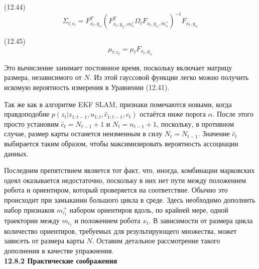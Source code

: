 \documentclass[10pt,a4paper]{article}
\begin{document}
(12.44)
$$\varSigma_{t:c_t}=F_{x_t,y_{c_t}}^T(F_{x_t,y_{c_t},m_{c_t}^+}^T\varOmega_tF_{x_t,y_{c_t},m_{c_t}^+})^{-1}F_{x_t,y_{c_t}}$$
	
(12.45)
$$\mu_{t:c_t}=\mu_tF_{x_t,y_{c_t}}$$

Это вычисление занимает постоянное время, поскольку включает матрицу размера, независимого от $N$. Из этой гауссовой функции легко можно получить искомую вероятность измерения в Уравнении (12.41).

Так же как в алгоритме EKF SLAM, признаки помечаются новыми, когда правдоподобие  $p(z_t|z_{1:t-1}, u_{1:t}, \hat{c}_{1:t-1}, c_t)$  остаётся ниже порога  $\alpha$. После этого просто установим $\hat{c}_t=N_{t-1}+1$ и $N_t=n_{t-1}+1$, поскольку, в противном случае, размер карты останется неизменным в силу $N_t=N_{t-1}$. Значение $\hat{c}_t$ выбирается таким образом, чтобы максимизировать вероятность ассоциации данных.

Последним препятствием является тот факт, что, иногда, комбинации марковских одеял оказывается недостаточно, поскольку в них нет пути между положением робота и ориентиром, который проверяется на соответствие. Обычно это происходит при замыкании большого цикла в среде. Здесь необходимо дополнить набор признаков $m_{c_t}^+$ набором ориентиров вдоль, по крайней мере, одной траектории между $m_{c_t}$ и положением робота $x_t$. В зависимости от размера цикла количество ориентиров, требуемых для результирующего множества, может зависеть от размера карты $N$. Оставим детальное рассмотрение такого дополнения в качестве упражнения.\\

\textbf{12.8.2	Практические соображения}\\
\end{document}
